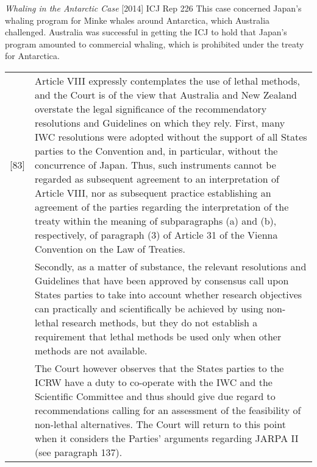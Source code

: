\begin{casedetails}{\textit{Whaling in the Antarctic Case} [2014] ICJ Rep 226}
    \flushleft
    This case concerned Japan's whaling program for Minke whales around Antarctica, which Australia challenged. Australia was successful in getting the ICJ to hold that Japan's program amounted to commercial whaling, which is prohibited under the treaty for Antarctica.

    \tcblower

    \begin{longtable}{r|>{\raggedright\arraybackslash}p{}}
        [83] & Article VIII expressly contemplates the use of lethal methods, and the Court is of the view that Australia and New Zealand overstate the legal significance of the recommendatory resolutions and Guidelines on which they rely. First, many IWC resolutions were adopted without the support of all States parties to the Convention and, in particular, without the concurrence of Japan. Thus, such instruments cannot be regarded as subsequent agreement to an interpretation of Article VIII, nor as subsequent practice establishing an agreement of the parties regarding the interpretation of the treaty within the meaning of subparagraphs (a) and (b), respectively, of paragraph (3) of Article 31 of the Vienna Convention on the Law of Treaties. \\

         & Secondly, as a matter of substance, the relevant resolutions and Guidelines that have been approved by consensus call upon States parties to take into account whether research objectives can practically and scientifically be achieved by using non-lethal research methods, but they do not establish a requirement that lethal methods be used only when other methods are not available. \\

         & The Court however observes that the States parties to the ICRW have a duty to co-operate with the IWC and the Scientific Committee and thus should give due regard to recommendations calling for an assessment of the feasibility of non-lethal alternatives. The Court will return to this point when it considers the Parties' arguments regarding JARPA II (see paragraph 137).
    \end{longtable} 
\end{casedetails}


